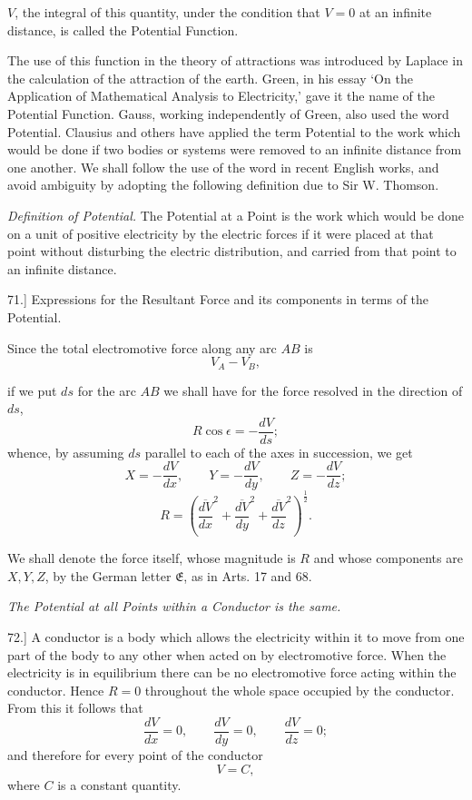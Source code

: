 \documentclass[11pt,a4paper]{article}
\begin{document}
\(V\), the integral of this quantity, under the condition that \(V=0\)
at an infinite distance, is called the Potential Function.

The use of this function in the theory of attractions was introduced
by Laplace in the calculation of the attraction of the earth. Green,
in his essay `On the Application of Mathematical Analysis to Electricity,'
gave it the name of the Potential Function. Gauss, working independently
of Green, also used the word Potential. Clausius and others have applied
the term Potential to the work which would be done if two bodies or
systems were removed to an infinite distance from one another. We shall
follow the use of the word in recent English works, and avoid ambiguity
by adopting the following definition due to Sir W. Thomson.

\textit{Definition of Potential.} The Potential at a Point is the work
which would be done on a unit of positive electricity by the electric
forces if it were placed at that point without disturbing the electric
distribution, and carried from that point to an infinite distance.

71.] Expressions for the Resultant Force and its components in terms
of the Potential.

Since the total electromotive force along any arc \(AB\) is
\[
V_A-V_B,
\]

\clearpage
\setcounter{footnote}{0}

if we put \(ds\) for the arc \(AB\) we shall have for the force resolved
in the direction of \(ds\),
\[
R\cos\epsilon=-\frac{dV}{ds};
\]
whence, by assuming \(ds\) parallel to each of the axes in succession,
we get
\[
X=-\frac{dV}{dx},\qquad Y=-\frac{dV}{dy},\qquad Z=-\frac{dV}{dz};
\]
\[
R=\left(\overline{\frac{dV}{dx}}^{2}
+\overline{\frac{dV}{dy}}^{2}
+\overline{\frac{dV}{dz}}^{2}\right)^{\frac{1}{2}}.
\]

We shall denote the force itself, whose magnitude is \(R\) and whose
components are \(X,Y,Z\), by the German letter \(\mathfrak{E}\), as in
Arts. 17 and 68.

\begin{center}
\textit{The Potential at all Points within a Conductor is the same.}
\end{center}

72.] A conductor is a body which allows the electricity within it to
move from one part of the body to any other when acted on by
electromotive force. When the electricity is in equilibrium there can
be no electromotive force acting within the conductor. Hence \(R=0\)
throughout the whole space occupied by the conductor. From this it
follows that
\[
\frac{dV}{dx}=0,\qquad \frac{dV}{dy}=0,\qquad \frac{dV}{dz}=0;
\]
and therefore for every point of the conductor
\[
V=C,
\]
where \(C\) is a constant quantity.
\end{document}
